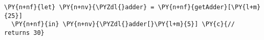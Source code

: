 \begin{Verbatim}[commandchars=\\\{\}]
\PY{n+nf}{let} \PY{n+nv}{\PYZdl{}adder} = \PY{n+nf}{getAdder}[\PY{l+m}{25}]
  \PY{n+nf}{in} \PY{n+nv}{\PYZdl{}adder[}\PY{l+m}{5}] \PY{c}{// returns 30}
\end{Verbatim}
